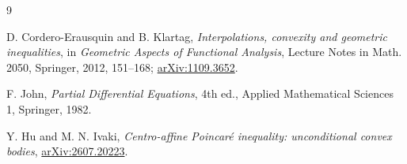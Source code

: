 \documentclass[11pt]{article}
\begin{document}
\begin{thebibliography}{9}

D. Cordero-Erausquin and B. Klartag,
\emph{Interpolations, convexity and geometric inequalities},
in \emph{Geometric Aspects of Functional Analysis}, Lecture Notes in Math.
2050, Springer, 2012, 151--168;
\href{https://arxiv.org/abs/1109.3652}{arXiv:1109.3652}.

F. John,
\emph{Partial Differential Equations}, 4th ed., Applied Mathematical
Sciences 1, Springer, 1982.

Y. Hu and M. N. Ivaki,
\emph{Centro-affine Poincar\'e inequality: unconditional convex bodies},
\href{https://arxiv.org/abs/2607.20223}{arXiv:2607.20223}.

\end{thebibliography}
\end{document}
